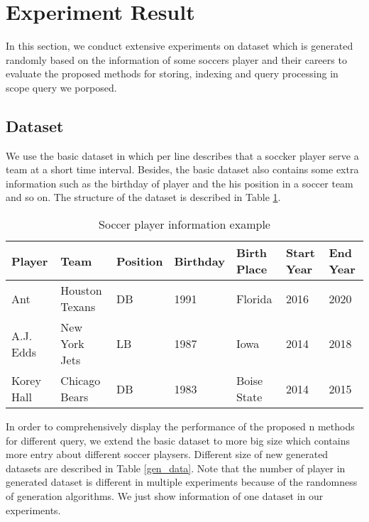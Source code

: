 
\section{Experiment Result}\label{Experiment Result}
In this section, we conduct extensive experiments on dataset which is generated 
randomly based on the information of some soccers player and their careers to 
evaluate the proposed methods for storing, indexing and query processing in scope 
query we porposed.

\subsection{Dataset}
We use the basic dataset in which per line describes that a soccker player serve a team
at a short time interval. Besides, the basic dataset also contains some  extra information 
such as the birthday of player and the his position in a soccer team and so on. The 
structure of the dataset is described in Table \ref{basic_data}.

\begin{table}
	\centering
	\caption{Soccer player information example}
	\label{basic_data}
	\begin{small}
		\begin{tabular}{p{1.6cm}|p{2.5cm}|p{1.2cm}|p{1.3cm}|p{1.7cm}|p{1.5cm}|p{1.5cm}}
			\hline
			Player & Team & Position & Birthday & Birth Place & Start Year & End Year\\ \hline
			Ant & Houston Texans & DB & 1991 & Florida & 2016 & 2020 \\\hline
			A.J. Edds & New York Jets & LB & 1987 & Iowa & 2014 & 2018 \\\hline
			Korey Hall & Chicago Bears & DB & 1983 & Boise State & 2014 & 2015 \\\hline
		\end{tabular}
	\end{small}
\end{table}

In order to comprehensively display the performance of the proposed n methods for different query, 
we extend the basic dataset to more big size which contains more entry about different soccer playsers.
Different size of new generated datasets are described in Table \ref{gen_data}. Note that the number of 
player in generated dataset is different in multiple experiments because of the randomness of generation 
algorithms. We just show information of one dataset in our experiments.

